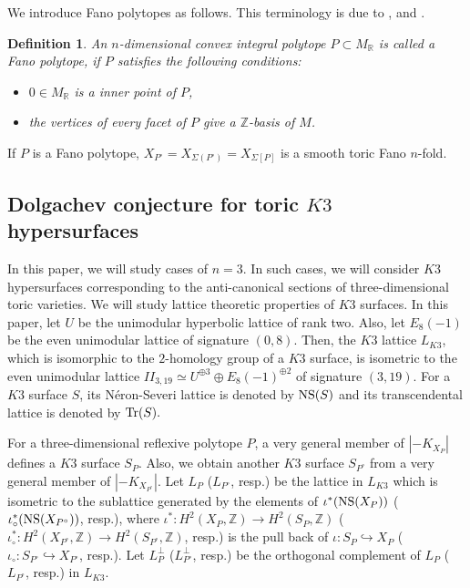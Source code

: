 \documentclass[10pt]{article}
\newtheorem{df}{Definition}[section]
\begin{document}
We introduce Fano polytopes as follows.
This terminology is due to   \cite{BToric4}, \cite{Sa}  and \cite{Ob}.

\begin{df}\label{dfFano}
An $n$-dimensional convex  integral polytope $P\subset M_\mathbb{R}$ is called a Fano polytope,
if $P$ satisfies the following conditions:
\begin{itemize}

\item[(i)] $0 \in M_\mathbb{R}$ is a inner point of $P$,

\item[(ii)] the vertices of every facet of $P$ give a $\mathbb{Z}$-basis of $M$.

\end{itemize}
\end{df}


If $P$ is a Fano polytope,
$X_{P^\circ}=X_{\Sigma(P^\circ)}=X_{\Sigma[P]}$ is a smooth toric Fano $n$-fold.




\subsection{Dolgachev conjecture for toric $K3$ hypersurfaces}

In this paper, we will study cases of $n=3$.
In such cases, we will consider $K3$ hypersurfaces corresponding to the anti-canonical sections of three-dimensional toric varieties. 
We will study  lattice theoretic properties of $K3$ surfaces.
In this paper, let $U$ be the unimodular hyperbolic lattice of rank two.
 Also, let $E_8 (-1)$ be  the even unimodular lattice of signature $(0,8)$.
 Then, the $K3$ lattice $L_{K3}$, which is isomorphic to the $2$-homology group of a $K3$ surface, is isometric to the even unimodular lattice
 $II_{3,19}\simeq U^{\oplus 3}\oplus   E_8(-1)^{\oplus 2}$ of signature $(3,19)$. 
For a $K3$ surface $S$, its N\'eron-Severi lattice is denoted by ${\rm NS}(S)$ and its transcendental lattice is denoted by ${\rm Tr}(S).$

For a three-dimensional reflexive polytope $P$,
a very general member  of $|-K_{X_P}|$ defines a $K3$ surface $S_P$.
Also, we obtain another $K3$ surface $S_{P^\circ}$ from a very general member of $|-K_{X_{P^\circ}}|$.
Let $L_P$ ($L_{P^\circ}$, resp.) be the lattice in $L_{K3}$ which is isometric to the  sublattice  generated by the elements of $\iota^* ({\rm NS}(X_P))$ ($\iota_\circ ^* ({\rm NS}(X_{P^\circ}))$, resp.), 
where $\iota^* : H^2(X_P,\mathbb{Z}) \rightarrow H^2(S_P,\mathbb{Z})$ ($\iota_\circ^* : H^2(X_{P^\circ},\mathbb{Z}) \rightarrow H^2(S_{P^\circ},\mathbb{Z})$, resp.)
is the pull back of $\iota: S_P \hookrightarrow X_P$ ($\iota_\circ : S_{P^\circ} \hookrightarrow X_{P^\circ}$, resp.).
Let $L_P^\perp$ ($L_{P^\circ}^\perp $, resp.) be the orthogonal complement of $L_P$ ($L_{P^\circ}$, resp.) in $L_{K3}$.
\end{document}
